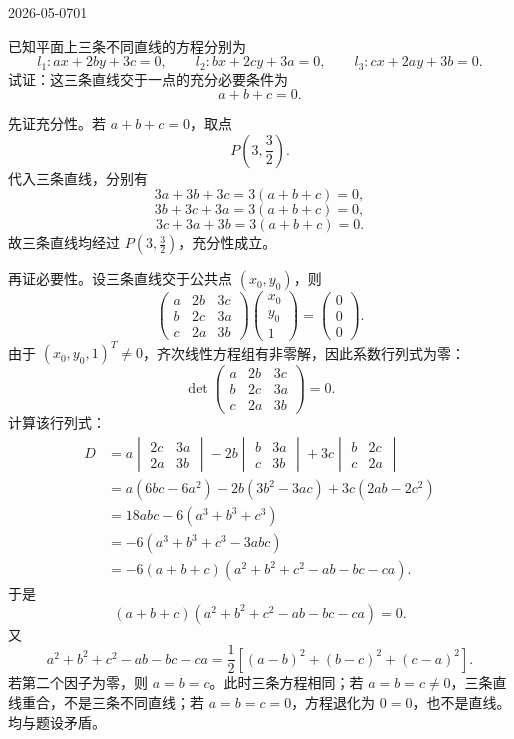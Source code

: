 \begin{mistake}{2026-05-07}{01}

\begin{problemcontent}
已知平面上三条不同直线的方程分别为
\[
l_1:ax+2by+3c=0,\qquad
l_2:bx+2cy+3a=0,\qquad
l_3:cx+2ay+3b=0.
\]
试证：这三条直线交于一点的充分必要条件为
\[
a+b+c=0.
\]
\end{problemcontent}

\begin{solutioncontent}
先证充分性。若 \(a+b+c=0\)，取点
\[
P\left(3,\frac32\right).
\]
代入三条直线，分别有
\[
3a+3b+3c=3(a+b+c)=0,
\]
\[
3b+3c+3a=3(a+b+c)=0,
\]
\[
3c+3a+3b=3(a+b+c)=0.
\]
故三条直线均经过 \(P\left(3,\frac32\right)\)，充分性成立。

再证必要性。设三条直线交于公共点 \((x_0,y_0)\)，则
\[
\begin{pmatrix}
a&2b&3c\\
b&2c&3a\\
c&2a&3b
\end{pmatrix}
\begin{pmatrix}
x_0\\y_0\\1
\end{pmatrix}
=
\begin{pmatrix}
0\\0\\0
\end{pmatrix}.
\]
由于 \((x_0,y_0,1)^T\neq 0\)，齐次线性方程组有非零解，因此系数行列式为零：
\[
\det
\begin{pmatrix}
a&2b&3c\\
b&2c&3a\\
c&2a&3b
\end{pmatrix}=0.
\]
计算该行列式：
\[
\begin{aligned}
D
&=a
\begin{vmatrix}
2c&3a\\
2a&3b
\end{vmatrix}
-2b
\begin{vmatrix}
b&3a\\
c&3b
\end{vmatrix}
+3c
\begin{vmatrix}
b&2c\\
c&2a
\end{vmatrix}\\
&=a(6bc-6a^2)-2b(3b^2-3ac)+3c(2ab-2c^2)\\
&=18abc-6(a^3+b^3+c^3)\\
&=-6(a^3+b^3+c^3-3abc)\\
&=-6(a+b+c)(a^2+b^2+c^2-ab-bc-ca).
\end{aligned}
\]
于是
\[
(a+b+c)(a^2+b^2+c^2-ab-bc-ca)=0.
\]
又
\[
a^2+b^2+c^2-ab-bc-ca
=\frac12\left[(a-b)^2+(b-c)^2+(c-a)^2\right].
\]
若第二个因子为零，则 \(a=b=c\)。此时三条方程相同；若 \(a=b=c\neq 0\)，三条直线重合，不是三条不同直线；若 \(a=b=c=0\)，方程退化为 \(0=0\)，也不是直线。均与题设矛盾。


\end{solutioncontent}
\end{mistake}
